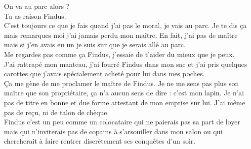 On va au parc alors ? \\

Tu as raison Findus. \\
C'est toujours ce que je fais quand j'ai pas le moral, je vais au parc. Je te dis ça mais remarques moi j'ai jamais perdu mon maître. En fait, j'ai pas de maître mais si j'en avais eu un je suis sur que je serais allé au parc.\\
Me regardes pas comme ça Findus, j'essaie de t'aider du mieux que je peux. \\

J'ai rattrapé mon manteau, j'ai fourré Findus dans mon sac et j'ai pris quelques carottes que j'avais spécialement acheté pour lui dans mes poches. \\

Ça me gène de me proclamer le maître de Findus. Je ne me sens pas plus son maître que son propriétaire, ça n'a aucun sens de dire : c'est mon lapin. Je n'ai pas de titre en bonne et due forme attestant de mon emprise sur lui. J'ai même pas de reçu, ni de talon de chèque. \\
Findus c'est un peu comme un colocataire qui ne paierais pas sa part de loyer mais qui n'inviterais pas de copains à s'arsouiller dans mon salon ou qui chercherait à faire rentrer discrètement ses conquêtes d'un soir.
